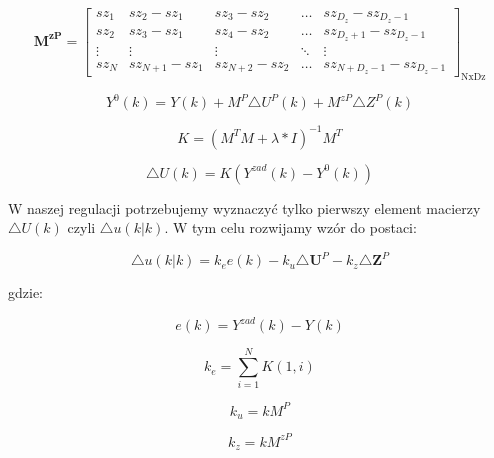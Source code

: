		\begin{equation}
		\boldsymbol{M^{zP}}=\left[
		\begin{array}
		{ccccc}
		sz_{1} & sz_{2}-sz_{1} & sz_{3}-sz_{2} & \ldots & sz_{D_z}-sz_{D_z-1}\\
		sz_{2} & sz_{3}-sz_{1} & sz_{4}-sz_{2} & \ldots & sz_{D_z+1}-sz_{D_z-1}\\
		\vdots & \vdots & \vdots & \ddots & \vdots\\
		sz_{N} & sz_{N+1}-sz_{1} & sz_{N+2}-sz_{2} & \ldots &  sz_{N+D_z-1}-sz_{D_z-1}
		\end{array}
		\right]_{\mathrm{NxDz}}
		\label{MPzm}
		\end{equation}
		
		\begin{equation}
		Y^0(k)=Y(k)+M^P\triangle U^P(k)+M^{zP}\triangle  Z^P(k)
		\label{Y0z}
		\end{equation}
		
		\begin{equation}
		K=(M^TM+\lambda*I)^{-1}M^T
		\label{K}
		\end{equation}
		
		\begin{equation}
		\triangle U(k)=K(Y^{zad}(k)-Y^0(k))
		\label{dU1}
		\end{equation}
		
		W naszej regulacji potrzebujemy wyznaczyć tylko pierwszy element macierzy $\triangle U(k)$ czyli $\triangle u(k|k)$. W tym celu rozwijamy wzór do postaci:
		
		\begin{equation}
		\triangle u(k|k)=k_ee(k)-k_u\triangle\boldsymbol U^P-k_z\triangle\boldsymbol Z^P
		\label{dukkz}
		\end{equation}
		
		gdzie:
		
		\begin{equation}
		e(k)=Y^{zad}(k)-Y(k)
		\label{e}
		\end{equation}
		
		\begin{equation}
		k_e=\sum_{i=1}^N K(1,i)
		\label{ke}
		\end{equation}
		
		\begin{equation}
		k_u=kM^P
		\label{ku}
		\end{equation}
		
		\begin{equation}
		k_z=kM^{zP}
		\label{kz}
		\end{equation}
		
